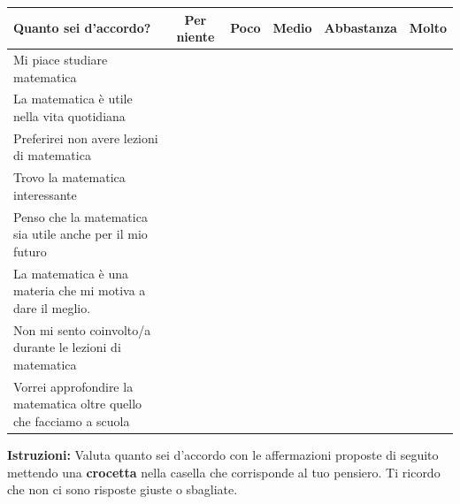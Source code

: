 \documentclass[11pt]{article}
\begin{document}
\noindent\begin{tabular}{|p{7cm}|c|c|c|c|c|}
  \hline
  \textbf{Quanto sei d'accordo?} & \textbf{Per niente} & \textbf{Poco} & \textbf{Medio} & \textbf{Abbastanza} & \textbf{Molto} \\
  \hline
  Mi piace studiare matematica & & & & & \\
  \hline
  La matematica è utile nella vita quotidiana & & & & & \\
  \hline
  Preferirei non avere lezioni di matematica & & & & & \\
  \hline
  Trovo la matematica interessante & & & & & \\
  \hline
  Penso che la matematica sia utile anche per il mio futuro & & & & & \\
  \hline
  La matematica è una materia che mi motiva a dare il meglio. & & & & & \\
  \hline 
  Non mi sento coinvolto/a durante le lezioni di matematica & & & & & \\
  \hline
  Vorrei approfondire la matematica oltre quello che facciamo a scuola & & & & & \\
  \hline
\end{tabular}


\newpage

\noindent\textbf{Istruzioni:} Valuta quanto sei d'accordo con le affermazioni proposte di seguito mettendo una \textbf{crocetta} nella casella che corrisponde al tuo pensiero. Ti ricordo che non ci sono risposte giuste o sbagliate. 
\newline
\end{document}
